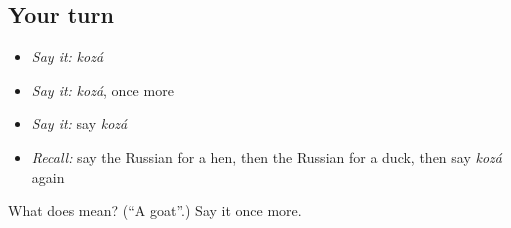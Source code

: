 \subsection*{Your turn}
\begin{itemize}
\raggedright
  \item \emph{Say it:} \emph{kozá}
  \item \emph{Say it:} \emph{kozá}, once more
  \item \emph{Say it:} say \emph{kozá}
  \item \emph{Recall:} say the Russian for a hen, then the Russian for a duck, then say \emph{kozá} again
\end{itemize}

\begin{tcolorbox}[breakable,colback=teal!4,colframe=teal!35!black,title={Before you move on}]
What does  mean? (\textquotedblleft{}A goat\textquotedblright{}.) Say it once more.
\end{tcolorbox}
